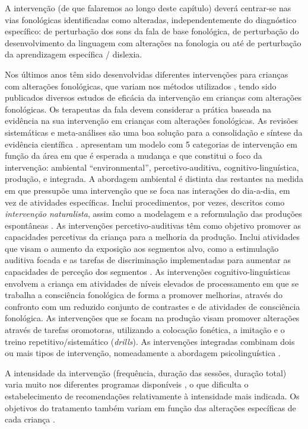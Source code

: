 \documentclass[output=paper,colorlinks,citecolor=brown,booklanguage=portuguese]{langscibook}
\begin{document}
A intervenção (de que falaremos ao longo deste capítulo) deverá centrar-se nas vias fonológicas identificadas como alteradas, independentemente do diagnóstico específico: de perturbação dos sons da fala de base fonológica, de perturbação do desenvolvimento da linguagem com alterações na fonologia ou até de perturbação da aprendizagem específica / dislexia.

Nos últimos anos têm sido desenvolvidas diferentes intervenções para crianças com alterações fonológicas, que variam nos métodos utilizados \citep{Baker2011, Law2012}, tendo sido publicados diversos estudos de eficácia da interven\-ção em crianças com alterações fonológicas. Os terapeutas da fala devem considerar a prática baseada na evidência na sua intervenção em crianças com alterações fonológicas. As revisões sistemáticas e meta-análises são uma boa solução para a consolidação e síntese da evidência científica \citep{Garrett2006}. \citet{Wren2018} apresentam um modelo com 5 categorias de intervenção em função da área em que é esperada a mudança e que constitui o foco da intervenção: ambiental “environmental”, percetivo-auditiva, cognitivo-linguística, produção, e integrada. A abordagem ambiental é distinta das restantes na medida em que pressupõe uma intervenção que se foca nas interações do dia-a-dia, em vez de atividades específicas. Inclui procedimentos, por vezes, descritos como \emph{intervenção naturalista}, assim como a modelagem e a reformulação das produções espontâneas \citep{Camarata2010}. As intervenções percetivo-auditivas têm como objetivo promover as capacidades percetivas da criança para a melhoria da produção. Inclui atividades que visam o aumento da exposição aos segmentos alvo, como a estimulação auditiva focada e as tarefas de discriminação implementadas para aumentar as capacidades de perceção dos segmentos \citep{Hodson1991, Rvachew2010}. As intervenções cognitivo-linguísticas envol\-vem a criança em atividades de níveis elevados de processamento em que se trabalha a consciência fonológica de forma a promover melhorias, através do confronto com um reduzido conjunto de contrastes e de atividades de consciência fonológica. As intervenções que se focam na produção visam promover alterações através de tarefas oromotoras, utilizando a colocação fonética, a imitação e o treino repetitivo/sistemático (\emph{drills}). As intervenções integradas combinam dois ou mais tipos de intervenção, nomeadamente a abordagem psicolinguística \citep{Stackhouse1997}. 

A intensidade da intervenção (frequência, duração das sessões, duração total) varia muito nos diferentes programas disponíveis \citep{Wren2018}, o que dificulta o estabelecimento de recomendações relativamente à intensidade mais indicada. Os objetivos do tratamento também variam em função das alterações específicas de cada criança \citep{Law2017}. 
\end{document}
